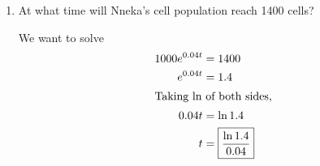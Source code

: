 \documentclass{article}
\begin{document}
\begin{enumerate}
\begin{enumerate}
\begin{solution}
      \begin{checkanswer}
        We can check this easily: If $N(t) = 1000 e^{0.04 t}$, then $N(0)
        = 1000$, and $\frac{dN}{dt} = (1000 e^{0.04 t}) 0.04 = 0.04 N$.
      \end{checkanswer}
    \end{solution}

  \item \label{spring2011-1b-final-9-time}
    \begin{problem}[\vfill]
      At what time will Nneka's cell population reach 1400 cells?
    \end{problem}

    \begin{solution}
      We want to solve
      \begin{align*}
        1000 e^{0.04 t} &= 1400 \\
        e^{0.04 t} &= 1.4 \\
        \shortintertext{Taking $\ln$ of both sides,}
        0.04 t &= \ln 1.4 \\
        t &= \boxed{\frac{\ln 1.4}{0.04}}
      \end{align*}
    \end{solution}





\end{enumerate}
\end{enumerate}
\end{document}
